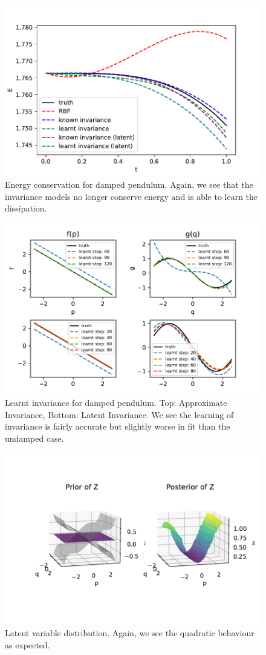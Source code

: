 \documentclass{statsmsc}
\begin{document}
\begin{figure}[H] 
  \includegraphics[width=0.8\linewidth]{../codes/figures/damped_pendulum_energy.pdf}
  \centering
  \caption{Energy conservation for damped pendulum. Again, we see that the invariance models no longer conserve energy and is able to learn the dissipation.}
  \label{fig:damped_pendulum_energy}
\end{figure}


\begin{figure}[H] 
  \includegraphics[width=0.8\linewidth]{../codes/figures/damped_pendulum_learnt_over_time.pdf}
  \centering
  \caption{Learnt invariance for damped pendulum. Top: Approximate Invariance, Bottom: Latent Invariance. We see the learning of invariance is fairly accurate but slightly worse in fit than the undamped case.}
  \label{fig:damped_pendulum_learnt}
\end{figure}

\begin{figure}[H] 
  \includegraphics[width=0.8\linewidth]{../codes/figures/latent_damped_pendulum.pdf}
  \centering
  \caption{Latent variable distribution. Again, we see the quadratic behaviour as expected.}
  \label{fig:latent_damped_pendulum}
\end{figure}
\end{document}
